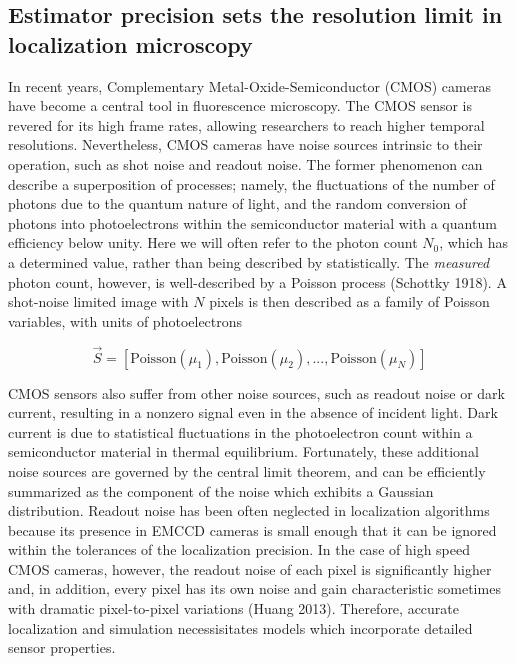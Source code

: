 \documentclass{ucetd}
\begin{document}

\subsection{Estimator precision sets the resolution limit in localization microscopy}

In recent years, Complementary Metal-Oxide-Semiconductor (CMOS) cameras have become a central tool in fluorescence microscopy. The CMOS sensor is revered for its high frame rates, allowing researchers to reach higher temporal resolutions. Nevertheless, CMOS cameras have noise sources intrinsic to their operation, such as shot noise and readout noise. The former phenomenon can describe a superposition of processes; namely, the fluctuations of the number of photons due to the quantum nature of light, and the random conversion of photons into photoelectrons within the semiconductor material with a quantum efficiency below unity. Here we will often refer to the photon count $N_{0}$, which has a determined value, rather than being described by statistically. The \emph{measured} photon count, however, is well-described by a Poisson process (Schottky 1918). A shot-noise limited image with $N$ pixels is then described as a family of Poisson variables, with units of photoelectrons


\begin{equation}
\vec{S} = \left[\mathrm{Poisson}(\mu_{1}), \mathrm{Poisson}(\mu_{2}), ..., \mathrm{Poisson}(\mu_{N})\right]
\end{equation}

CMOS sensors also suffer from other noise sources, such as readout noise or dark current, resulting in a nonzero signal even in the absence of incident light. Dark current is due to statistical fluctuations in the photoelectron count within a semiconductor material in thermal equilibrium. Fortunately, these additional noise sources are governed by the central limit theorem, and can be efficiently summarized as the component of the noise which exhibits a Gaussian distribution. Readout noise has been often neglected in localization algorithms because its presence in EMCCD cameras is small enough that it can be ignored within the tolerances of the localization precision. In the case of high speed CMOS cameras, however, the readout noise of each pixel is significantly higher and, in addition, every pixel has its own noise and gain characteristic sometimes with dramatic pixel-to-pixel variations (Huang 2013). Therefore, accurate localization and simulation necessisitates models which incorporate detailed sensor properties. 
\end{document}
